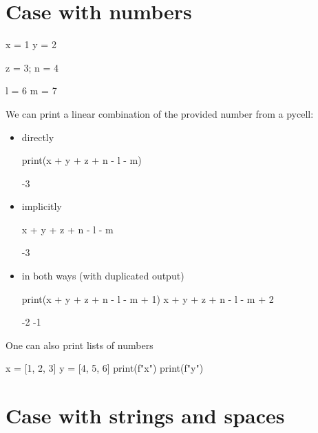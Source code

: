 \documentclass{book}
\begin{document}
\chapter{Case with numbers}

\begin{pycell}
x = 1
y = 2
\end{pycell}

\begin{pycell}
z = 3; n = 4
\end{pycell}

\begin{pycell}
l = 6
m = 7
\end{pycell}


We can print a linear combination of the provided number from a pycell:

\begin{itemize}
\item directly
\begin{pycell}
print(x + y + z + n - l - m)
\end{pycell}
\begin{pyexpectedoutput}
-3
\end{pyexpectedoutput}
\item implicitly
\begin{pycell}
x + y + z + n - l - m
\end{pycell}
\begin{pyexpectedoutput}
-3
\end{pyexpectedoutput}
\item in both ways (with duplicated output)
\begin{pycell}
print(x + y + z + n - l - m + 1)
x + y + z + n - l - m + 2
\end{pycell}
\begin{pyexpectedoutput}
-2
-1
\end{pyexpectedoutput}
\end{itemize}

One can also print lists of numbers
\begin{pycell}
x = [1, 2, 3]
y = [4, 5, 6]
print(f"{x}")
print(f"{y}")
\end{pycell}
\begin{pyexpectedoutput}
[1, 2, 3]
[4, 5, 6]
\end{pyexpectedoutput}


\chapter{Case with strings and spaces}
\end{document}
